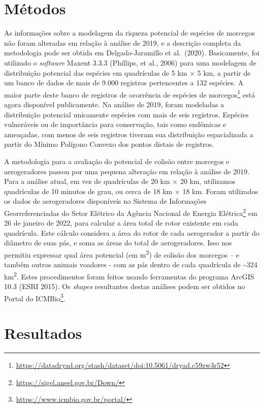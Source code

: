 \documentclass[
  oneside]{scrbook}
\DeclareRobustCommand{\href}[2]{#2\footnote{\url{#1}}}
\begin{document}
\hypertarget{muxe9todos}{%
\section{Métodos}\label{muxe9todos}}

As informações sobre a modelagem da riqueza potencial de espécies de morcegos não foram alteradas em relação à análise de 2019, e a descrição completa da metodologia pode ser obtida em Delgado-Jaramillo et al.~(2020). Basicamente, foi utilizado o \emph{software} Maxent 3.3.3 (Phillips, et al., 2006) para uma modelagem de distribuição potencial das espécies em quadrículas de 5 km × 5 km, a partir de um banco de dados de mais de 9.000 registros pertencentes a 132 espécies. A maior parte deste \href{https://datadryad.org/stash/dataset/doi:10.5061/dryad.c59zw3r52}{banco de registros de ocorrência de espécies de morcegos} está agora disponível publicamente. Na análise de 2019, foram modeladas a distribuição potencial unicamente espécies com mais de seis registros. Espécies vulneráveis ou de importância para conservação, tais como endêmicas e ameaçadas, com menos de seis registros tiveram sua distribuição espacializada a partir do Mínimo Polígono Convexo dos pontos distais de registros.

A metodologia para a avaliação do potencial de colisão entre morcegos e aerogeradores passou por uma pequena alteração em relação à análise de 2019. Para a análise atual, em vez de quadrículas de 20 km × 20 km, utilizamos quadrículas de 10 minutos de grau, ou cerca de 18 km × 18 km. Foram utilizados os dados de aerogeradores disponíveis no \href{https://sigel.aneel.gov.br/Down/}{Sistema de Informações Georreferenciadas do Setor Elétrico da Agência Nacional de Energia Elétrica} em 26 de janeiro de 2022, para calcular a área total de rotor existente em cada quadrícula. Este cálculo considera a área do rotor de cada aerogerador a partir do diâmetro de suas pás, e soma as áreas do total de aerogeradores. Isso nos permitiu expressar qual área potencial (em m\textsuperscript{2}) de colisão dos morcegos -- e também outros animais voadores - com as pás dentro de cada quadrícula de \textasciitilde324 km\textsuperscript{2}. Estes procedimentos foram feitos usando ferramentas do programa ArcGIS 10.3 (ESRI 2015). Os \emph{shapes} resultantes destas análises podem ser obtidos no \href{https://www.icmbio.gov.br/portal/}{Portal do ICMBio}.

\hypertarget{resultados-2}{%
\section{Resultados}\label{resultados-2}}
\end{document}
